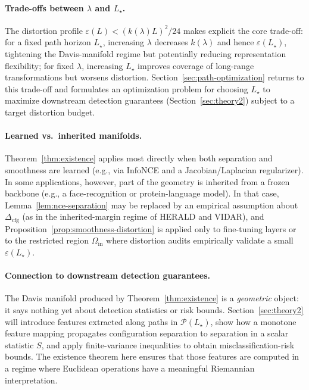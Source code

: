 \documentclass[11pt]{article}
\theoremstyle{remark}
\theoremstyle{plain}
\begin{document}
\paragraph{Trade-offs between $\lambda$ and $L_\star$.}
The distortion profile $\varepsilon(L) < (k(\lambda)L)^2/24$ makes explicit the core trade-off:
for a fixed path horizon $L_\star$, increasing $\lambda$ decreases $k(\lambda)$ and hence
$\varepsilon(L_\star)$, tightening the Davis-manifold regime but potentially reducing representation
flexibility; for fixed $\lambda$, increasing $L_\star$ improves coverage of long-range transformations
but worsens distortion. Section~\ref{sec:path-optimization} returns to this trade-off and formulates
an optimization problem for choosing $L_\star$ to maximize downstream detection guarantees
(Section~\ref{sec:theory2}) subject to a target distortion budget.

\paragraph{Learned vs.\ inherited manifolds.}
Theorem~\ref{thm:existence} applies most directly when both separation and smoothness are
learned (e.g., via InfoNCE and a Jacobian/Laplacian regularizer). In some applications, however,
part of the geometry is inherited from a frozen backbone (e.g., a face-recognition or protein-language
model). In that case, Lemma~\ref{lem:nce-separation} may be replaced by an empirical assumption
about $\Delta_{\mathrm{cfg}}$ (as in the inherited-margin regime of HERALD and VIDAR), and
Proposition~\ref{prop:smoothness-distortion} is applied only to fine-tuning layers or to the
restricted region $\Omega_{\mathrm{in}}$ where distortion audits empirically validate a small
$\varepsilon(L_\star)$.

\paragraph{Connection to downstream detection guarantees.}
The Davis manifold produced by Theorem~\ref{thm:existence} is a \emph{geometric} object: it says
nothing yet about detection statistics or risk bounds. Section~\ref{sec:theory2} will introduce
features extracted along paths in $\mathcal{P}(L_\star)$, show how a monotone feature mapping
propagates configuration separation to separation in a scalar statistic $S$, and apply finite-variance
inequalities to obtain misclassification-risk bounds. The existence theorem here ensures that those
features are computed in a regime where Euclidean operations have a meaningful Riemannian
interpretation.
\end{document}
